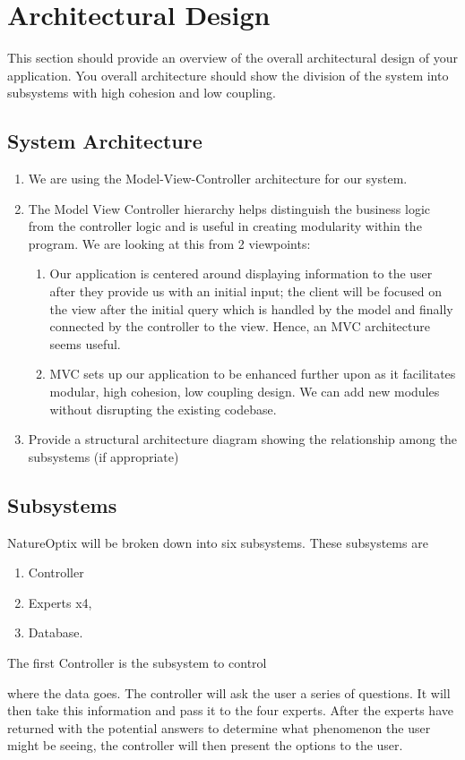 \documentclass[]{article}
\begin{document}
\section{Architectural Design}
\label{sec:architectural_design}
This section should provide an overview of the overall architectural design of your application. You overall architecture should show the division of the system into subsystems with high cohesion and low coupling.

\subsection{System Architecture}
\label{sub:system_architecture}
\begin{enumerate}[1)]
	\item We are using the Model-View-Controller architecture for our system.
	\item The Model View Controller hierarchy helps distinguish the business logic from the controller logic and is useful in creating modularity within the program. We are looking at this from 2 viewpoints:
	\begin{enumerate}
		\item Our application is centered around displaying information to the user after they provide us with an initial input; the client will be focused on the view after the initial query which is handled by the model and finally connected by the controller to the view. Hence, an MVC architecture seems useful.
		\item MVC sets up our application to be enhanced further upon as it facilitates modular, high cohesion, low coupling design. We can add new modules without disrupting the existing codebase.
	\end{enumerate}
	\item Provide a structural architecture diagram showing the relationship among the subsystems (if appropriate)
\end{enumerate}

\subsection{Subsystems}
\label{sub:subsystems}
NatureOptix will be broken down into six subsystems. These subsystems are
\begin{enumerate}
	\item Controller %
	\item Experts x4,
	\item Database.
\end{enumerate}
The first Controller is the subsystem to control where the data goes. The controller will ask the user a series of questions. It will then take this information and pass it to the four experts. After the experts have returned with the potential answers to determine what phenomenon the user might be seeing, the controller will then present the options to the user. 
\end{document}
